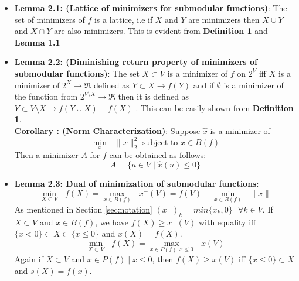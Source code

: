 \begin{itemize}
 \item {\bf Lemma 2.1: (Lattice of minimizers for submodular functions)}: The set of minimizers of $f$ is a lattice, i.e if $X$ and $Y$ are minimizers then $X\cup Y$ and $X \cap Y$ are also minimizers. This is evident from {\bf Definition 1} and {\bf Lemma 1.1}\\

 \item {\bf Lemma 2.2: (Diminishing return property of minimizers of submodular functions)}: The set $X \subset V$ is a minimizer of $f$ on $2^V$ iff $X$ is a minimizer of $2^X \rightarrow \Re$ defined as $Y \subset X \rightarrow f(Y)$ and if $\emptyset$ is a minimizer of the function from $2^{V\setminus X} \rightarrow \Re$  then it is defined as $Y \subset V\setminus X \rightarrow f(Y \cup X) - f(X)$ . This can be easily shown from {\bf Definition 1}.\\
 
  {\bf Corollary : (Norm Characterization)}: Suppose $\hat{x}$ is a minimizer of 
 \[
  \underset{x}{\operatorname{min }}\text{ } \| x\|_2^2 \text{ subject to } x\in B(f)
 \]
 Then a minimizer $A$ for $f$ can be obtained as follows:
 \[
   A = \{ u \in V \mid \hat{x}(u) \leq 0\}
 \]

  \item{\bf Lemma 2.3: Dual of minimization of submodular functions}: \[ \underset{X \subset V}{\operatorname{min }}\text{ } f(X) =  \underset{x \in B(f) }{\operatorname{max }}\text{ } x^-(V) = f(V) - \underset{x \in B(f) }{\operatorname{min }}\text{ } \|x\| \]
  As mentioned in Section \ref{sec:notation} $(x^-)_k = min\{x_k,0\} \text{ } \forall k \in V$. If $X \subset V$ and $x \in B(f)$, we have $f(X) \geq x^-(V)$ with equality iff $\{ x < 0 \} \subset X \subset \{ x\leq 0\}$ and $x(X) = f(X)$. \\
  \[
   \underset{X \subset V}{\operatorname{min }}\text{ } f(X) =  \underset{x \in P(f), x\leq 0 }{\operatorname{max }}\text{ } x(V)
  \]
  Again if $X\subset V$ and $x\in P(f) \mid x \leq 0$, then $f(X) \geq x(V)$ iff $\{x \leq 0 \} \subset X$ and $s(X) = f(x)$.\\

\end{itemize}
